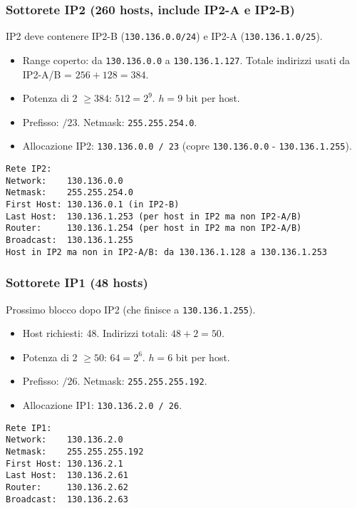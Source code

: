 \subsubsection{Sottorete IP2 (260 hosts, include IP2-A e IP2-B)}
IP2 deve contenere IP2-B (\texttt{130.136.0.0/24}) e IP2-A (\texttt{130.136.1.0/25}).
\begin{itemize}
    \item Range coperto: da \texttt{130.136.0.0} a \texttt{130.136.1.127}. Totale indirizzi usati da IP2-A/B = $256 + 128 = 384$.
    \item Potenza di 2 $\geq 384$: $512 = 2^9$. $h=9$ bit per host.
    \item Prefisso: $/23$. Netmask: \texttt{255.255.254.0}.
    \item Allocazione IP2: \texttt{130.136.0.0 / 23} (copre \texttt{130.136.0.0} - \texttt{130.136.1.255}).
\end{itemize}
\begin{verbatim}
Rete IP2:
Network:    130.136.0.0
Netmask:    255.255.254.0
First Host: 130.136.0.1 (in IP2-B)
Last Host:  130.136.1.253 (per host in IP2 ma non IP2-A/B)
Router:     130.136.1.254 (per host in IP2 ma non IP2-A/B)
Broadcast:  130.136.1.255
Host in IP2 ma non in IP2-A/B: da 130.136.1.128 a 130.136.1.253
\end{verbatim}

\subsubsection{Sottorete IP1 (48 hosts)}
Prossimo blocco dopo IP2 (che finisce a \texttt{130.136.1.255}).
\begin{itemize}
    \item Host richiesti: 48. Indirizzi totali: $48 + 2 = 50$.
    \item Potenza di 2 $\geq 50$: $64 = 2^6$. $h=6$ bit per host.
    \item Prefisso: $/26$. Netmask: \texttt{255.255.255.192}.
    \item Allocazione IP1: \texttt{130.136.2.0 / 26}.
\end{itemize}
\begin{verbatim}
Rete IP1:
Network:    130.136.2.0
Netmask:    255.255.255.192
First Host: 130.136.2.1
Last Host:  130.136.2.61
Router:     130.136.2.62
Broadcast:  130.136.2.63
\end{verbatim}

